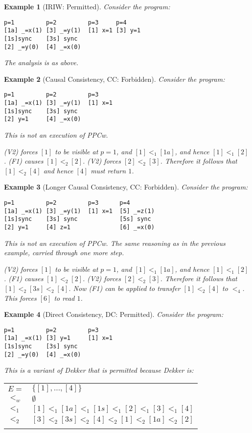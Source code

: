 \documentclass[10pt]{article}
\newtheorem{example}{Example}[section]
\begin{document}
\begin{example}[IRIW: Permitted]
Consider the program:
\begin{verbatim}
p=1         p=2         p=3     p=4
[1a] _=x(1) [3] _=y(1)  [1] x=1 [3] y=1
[1s]sync    [3s] sync
[2] _=y(0)  [4] _=x(0)
\end{verbatim}

The analysis is as above.
\end{example}

\begin{example}[Causal Consistency, CC: Forbidden]
Consider the program:
\begin{verbatim}
p=1         p=2         p=3     
[1a] _=x(1) [3] _=y(1)  [1] x=1 
[1s]sync    [3s] sync
[2] y=1     [4] _=x(0)
\end{verbatim}

This is not an execution of PPCw. 

(V2) forces $[1]$ to be visible at $p=1$, and $[1] <_1 [1a]$, and
hence $[1] <_1 [2]$. (F1) causes $[1] <_2 [2]$.  (V2) forces $[2] <_2
[3]$. Therefore it follows that $[1] <_2 [4]$ and hence $[4]$ must
return $1$.
  
\end{example}

\begin{example}[Longer Causal Consistency, CC: Forbidden]
Consider the program:
\begin{verbatim}
p=1         p=2         p=3      p=4
[1a] _=x(1) [3] _=y(1)  [1] x=1  [5] _=z(1)
[1s]sync    [3s] sync            [5s] sync
[2] y=1     [4] z=1              [6] _=x(0)
\end{verbatim}

This is not an execution of PPCw. The same reasoning as in the
previous example, carried through one more step.

(V2) forces $[1]$ to be visible at $p=1$, and $[1] <_1 [1a]$, and
hence $[1] <_1 [2]$. (F1) causes $[1] <_2 [2]$.  (V2) forces $[2] <_2
[3]$. Therefore it follows that $[1] <_2 [3s] <_2 [4]$. Now (F1)
can be applied to transfer $[1] <_2 [4]$ to $<_4$. This forces
$[6]$ to read $1$.
  
\end{example}

\begin{example}[Direct Consistency, DC: Permitted]
Consider the program:
\begin{verbatim}
p=1         p=2         p=3     
[1a] _=x(1) [3] y=1     [1] x=1 
[1s]sync    [3s] sync
[2] _=y(0)  [4] _=x(0)
\end{verbatim}

This is a variant of Dekker that is permitted because Dekker is:

\begin{tabular}[t]{ll}
  $E=$ & $\{[1],\ldots, [4]\}$ \\
  $<_w$ & $\emptyset$\\
  $<_1$ & $[1] <_1 [1a] <_1 [1s] <_1 [2] <_1 [3] <_1 [4]$\\{}
  $<_2$ & $[3] <_2 [3s] <_2 [4] <_2 [1] <_2 [1a] <_2 [2]$\\{}
\end{tabular}

\end{example}
\end{document}
